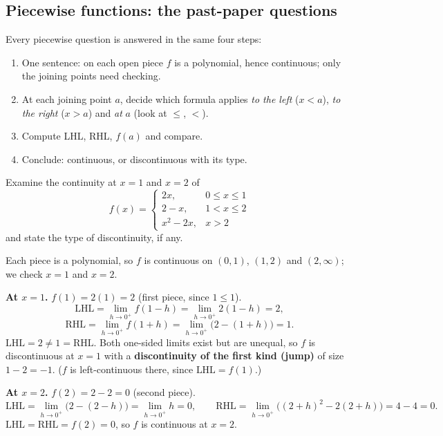 \subsection{Piecewise functions: the past-paper questions}
Every piecewise question is answered in the same four steps:
\begin{enumerate}
\item One sentence: on each open piece $f$ is a polynomial, hence continuous; only the joining points need checking.
\item At each joining point $a$, decide which formula applies \emph{to the left} ($x<a$), \emph{to the right} ($x>a$) and \emph{at} $a$ (look at $\le$, $<$).
\item Compute LHL, RHL, $f(a)$ and compare.
\item Conclude: continuous, or discontinuous with its type.
\end{enumerate}

\begin{example}[DU 12910 Q1(b)]
Examine the continuity at $x=1$ and $x=2$ of
\[
f(x)=\begin{cases}2x,&0\le x\le1\\ 2-x,&1<x\le2\\ x^2-2x,&x>2\end{cases}
\]
and state the type of discontinuity, if any.
\end{example}
\begin{solution}
Each piece is a polynomial, so $f$ is continuous on $(0,1)$, $(1,2)$ and $(2,\infty)$; we check $x=1$ and $x=2$.

\textbf{At $x=1$.} $f(1)=2(1)=2$ (first piece, since $1\le1$).
\[
\text{LHL}=\lim_{h\to0^+}f(1-h)=\lim_{h\to0^+}2(1-h)=2,
\]
\[
\text{RHL}=\lim_{h\to0^+}f(1+h)=\lim_{h\to0^+}\bigl(2-(1+h)\bigr)=1 .
\]
$\text{LHL}=2\ne1=\text{RHL}$. Both one-sided limits exist but are unequal, so $f$ is discontinuous at $x=1$ with a \textbf{discontinuity of the first kind (jump)} of size $1-2=-1$. ($f$ is left-continuous there, since $\text{LHL}=f(1)$.)

\textbf{At $x=2$.} $f(2)=2-2=0$ (second piece).
\[
\text{LHL}=\lim_{h\to0^+}\bigl(2-(2-h)\bigr)=\lim_{h\to0^+}h=0,\qquad \text{RHL}=\lim_{h\to0^+}\bigl((2+h)^2-2(2+h)\bigr)=4-4=0 .
\]
$\text{LHL}=\text{RHL}=f(2)=0$, so $f$ is continuous at $x=2$.
\end{solution}

